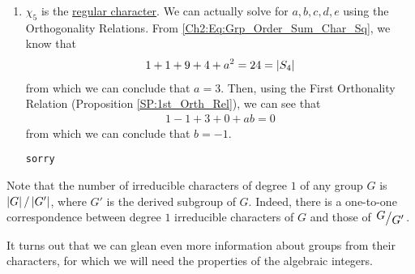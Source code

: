 \begin{boxexample}[$S_4$]
\begin{enumerate}
        \item $\chi_5$ is the \underline{regular character}. We can actually solve for $a,b,c,d,e$ using the Orthogonality Relations. From \eqref{Ch2:Eq:Grp_Order_Sum_Char_Sq}, we know that
        \begin{align*}
            1 + 1 + 9 + 4 + a^2 = 24 = \left\lvert S_4 \right\rvert
        \end{align*}
        from which we can conclude that $a = 3$. Then, using the First Orthonality Relation (Proposition \ref{SP:1st_Orth_Rel}), we can see that
        \begin{align*}
            1 - 1 + 3 + 0 + ab = 0
        \end{align*}
        from which we can conclude that $b = -1$.

        \verb|sorry|
    \end{enumerate}
\end{boxexample}

Note that the number of irreducible characters of degree $1$ of any group $G$ is $\left\lvert G \right\rvert / \left\lvert G' \right\rvert$, where $G'$ is the derived subgroup of $G$. Indeed, there is a one-to-one correspondence between degree $1$ irreducible characters of $G$ and those of $\quotient{G}{G'}$.

It turns out that we can glean even more information about groups from their characters, for which we will need the properties of the algebraic integers.